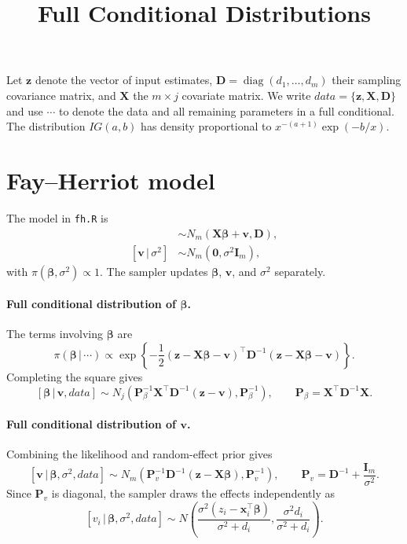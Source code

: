 \documentclass[11pt]{article}
\title{Full Conditional Distributions}
\author{}
\date{}
\newcommand{\bb}[1]{\boldsymbol{#1}}
\newcommand{\given}{\,|\,}
\begin{document}
\maketitle

Let $\bb z$ denote the vector of input estimates, $\bb D=\operatorname{diag}(d_1,\ldots,d_m)$ their sampling covariance matrix, and $\bb X$ the $m\times j$ covariate matrix.
We write $data=\{\bb z,\bb X,\bb D\}$ and use $\cdots$ to denote the data and all remaining parameters in a full conditional.
The distribution $IG(a,b)$ has density proportional to $x^{-(a+1)}\exp(-b/x)$.

\section*{Fay--Herriot model}
The model in \texttt{fh.R} is
\begin{align*}
 [\bb z\given\bb\beta,\bb v]
 &\sim N_m(\bb X\bb\beta+\bb v,\bb D),\\
 [\bb v\given\sigma^2]
 &\sim N_m(\bb 0,\sigma^2\bb I_m),
\end{align*}
with $\pi(\bb\beta,\sigma^2)\propto 1$.
The sampler updates $\bb\beta$, $\bb v$, and $\sigma^2$ separately.

\paragraph{Full conditional distribution of $\bb\beta$.}
The terms involving $\bb\beta$ are
\[
 \pi(\bb\beta\given\cdots)\propto
 \exp\left\{-\frac12(\bb z-\bb X\bb\beta-\bb v)^\top
 \bb D^{-1}(\bb z-\bb X\bb\beta-\bb v)\right\}.
\]
Completing the square gives
\[
 [\bb\beta\given\bb v,data]\sim
 N_j\left(\bb P_\beta^{-1}\bb X^\top\bb D^{-1}(\bb z-\bb v),
          \bb P_\beta^{-1}\right),
 \qquad \bb P_\beta=\bb X^\top\bb D^{-1}\bb X.
\]

\paragraph{Full conditional distribution of $\bb v$.}
Combining the likelihood and random-effect prior gives
\[
 [\bb v\given\bb\beta,\sigma^2,data]\sim
 N_m\left(\bb P_v^{-1}\bb D^{-1}(\bb z-\bb X\bb\beta),
          \bb P_v^{-1}\right),
 \qquad \bb P_v=\bb D^{-1}+\frac{\bb I_m}{\sigma^2}.
\]
Since $\bb P_v$ is diagonal, the sampler draws the effects independently as
\[
 [v_i\given\bb\beta,\sigma^2,data]\sim
 N\left(\frac{\sigma^2(z_i-\bb x_i^\top\bb\beta)}{\sigma^2+d_i},
         \frac{\sigma^2d_i}{\sigma^2+d_i}\right).
\]
\end{document}
